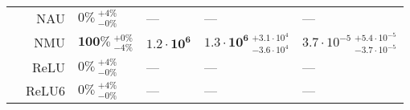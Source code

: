 \begin{longtable}{crllll}
\nopagebreak
 & NAU & $0\% {~}^{+4\%}_{-0\%}$ & --- & --- & ---\\

\nopagebreak
 & NMU & $\mathbf{100\%} {~}^{+0\%}_{-4\%}$ & $\mathbf{1.2 \cdot 10^{6}}$ & $\mathbf{1.3 \cdot 10^{6}} {~}^{+3.1 \cdot 10^{4}}_{-3.6 \cdot 10^{4}}$ & $3.7 \cdot 10^{-5} {~}^{+5.4 \cdot 10^{-5}}_{-3.7 \cdot 10^{-5}}$\\

\nopagebreak
 & ReLU & $0\% {~}^{+4\%}_{-0\%}$ & --- & --- & ---\\

\nopagebreak
\multirow{-10}{*}{\centering\arraybackslash $z^2$} & ReLU6 & $0\% {~}^{+4\%}_{-0\%}$ & --- & --- & ---\\*
\end{longtable}
